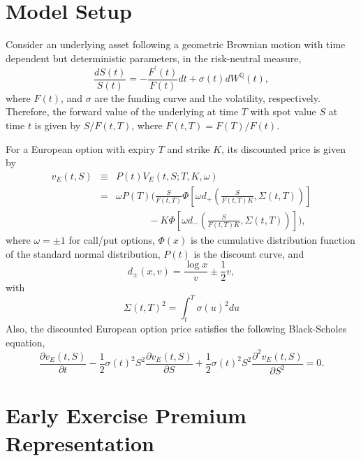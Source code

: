 \documentclass[12pt]{article}
\begin{document}
  \section{Model Setup}

    Consider an underlying asset following a geometric Brownian motion with time dependent but deterministic
    parameters, in the risk-neutral measure,
    \begin{equation}
      \frac{dS(t)}{S(t)}=-\frac{F^{\prime}(t)}{F(t)}dt+\sigma(t)dW^{\mathbb{Q}}(t),
    \end{equation}
    where $F(t)$, and $\sigma$ are the funding curve and the volatility, respectively. Therefore, the
    forward value of the underlying at time $T$ with spot value $S$ at time $t$ is given by $S/F(t,T)$,
    where $F(t,T)=F(T)/F(t)$.

    For a European option with expiry $T$ and strike $K$, its discounted price is given by
    \begin{eqnarray}
      \label{Euro1}
      v_E(t,S)&\equiv&P(t)V_E(t,S;T,K,\omega)\nonumber\\
                         &=&\omega P(T)\bigg(\frac{S}{F(t,T)}\Phi\left[\omega d_+\left(\frac{S}{F(t,T)K},\Sigma(t,T)\right)\right]\nonumber\\
                         &&\ \ \ \ \ \ \ \ \ \ \ \ \ \ \ -K\Phi\left[\omega d_-\left(\frac{S}{F(t,T)K},\Sigma(t,T)\right)\right]\bigg),
    \end{eqnarray}
    where $\omega=\pm 1$ for call/put options, $\Phi(x)$ is the cumulative distribution function of the standard normal distribution,
    $P(t)$ is the discount curve, and
    \begin{equation}
      d_{\pm}(x, v)=\frac{\log x}{v}\pm\frac{1}{2}v,
    \end{equation}
    with
    \begin{equation}
      \Sigma(t,T)^2=\int_t^T\sigma(u)^2du
    \end{equation}
    Also, the discounted European option price satisfies the following Black-Scholes equation,
    \begin{equation}
      \frac{\partial v_E(t,S)}{\partial t}-\frac{1}{2}\sigma(t)^2S^2\frac{\partial v_E(t,S)}{\partial S}
         +\frac{1}{2}\sigma(t)^2S^2\frac{\partial^2 v_E(t,S)}{\partial S^2}=0.
    \end{equation}



  \section{Early Exercise Premium Representation}
\end{document}
